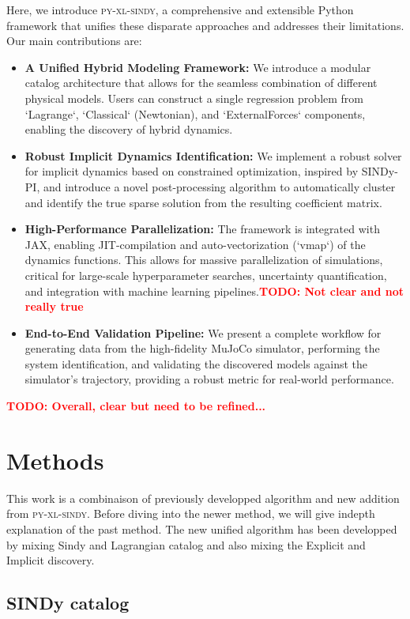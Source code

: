 \documentclass[12pt]{article}
\newcommand{\frameworkname}{\textsc{py-xl-sindy}}
\newcommand{\TODO}[1]{\textbf{\textcolor{red}{\Large TODO: \normalsize #1}}}
\begin{document}
Here, we introduce \frameworkname, a comprehensive and extensible Python framework that unifies these disparate approaches and addresses their limitations. Our main contributions are:
\begin{itemize}
    \item \textbf{A Unified Hybrid Modeling Framework:} We introduce a modular catalog architecture that allows for the seamless combination of different physical models. Users can construct a single regression problem from `Lagrange`, `Classical` (Newtonian), and `ExternalForces` components, enabling the discovery of hybrid dynamics.
    \item \textbf{Robust Implicit Dynamics Identification:} We implement a robust solver for implicit dynamics based on constrained optimization, inspired by SINDy-PI, and introduce a novel post-processing algorithm to automatically cluster and identify the true sparse solution from the resulting coefficient matrix.
    \item \textbf{High-Performance Parallelization:} The framework is integrated with JAX, enabling JIT-compilation and auto-vectorization (`vmap`) of the dynamics functions. This allows for massive parallelization of simulations, critical for large-scale hyperparameter searches, uncertainty quantification, and integration with machine learning pipelines.\TODO{Not clear and not really true}
    \item \textbf{End-to-End Validation Pipeline:} We present a complete workflow for generating data from the high-fidelity MuJoCo simulator, performing the system identification, and validating the discovered models against the simulator's trajectory, providing a robust metric for real-world performance.
\end{itemize}
\TODO{Overall, clear but need to be refined... }

\section*{Methods}

This work is a combinaison of previously developped algorithm and new addition from \frameworkname. Before diving into the newer method, we will give indepth explanation of the past method. The new unified algorithm has been developped by mixing Sindy and Lagrangian \cite{purnomoSparseIdentificationLagrangian2023} catalog and also mixing the Explicit and Implicit discovery.

\subsection*{SINDy catalog}
\end{document}

